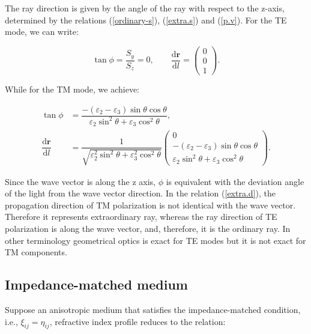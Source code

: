 \documentclass[9pt,twocolumn,twoside]{osajnl}
\begin{document}
 The ray direction is given by the angle of the ray with respect to the z-axis, determined  by the relations (\ref{ordinary-s}), (\ref{extra.s}) and (\ref{p.v}).
 For the TE mode, we can write:

 \begin{equation}\label{ordinary-d}
\tan{\phi}=\dfrac{S_{y}}{S_{z}}=0, \qquad \dfrac{\mathbf{\mathrm{d}{r}}}{\mathrm{d}{l}}=
 \begin{pmatrix}
 0\\0\\1
 \end{pmatrix}.
\end{equation}

While for the TM mode, we achieve:

\begin{equation}\label{extra.d}\begin{split}
\tan\phi & =\dfrac{-(\varepsilon_{2}-\varepsilon_{3})\sin{\theta}\cos{\theta}}{\varepsilon_{2} \sin^{2}{\theta} + \varepsilon_{3}\cos^{2}{\theta}},\\
 \dfrac{\mathbf{\mathrm{d}{r}}}{\mathrm{d}{l}} & =\dfrac{1}{\sqrt{\varepsilon_{2}^{2} \sin^{2}{\theta} + \varepsilon_{3}^{2}\cos^{2}{\theta}}}
 \begin{pmatrix}
 0\\ -(\varepsilon_{2}-\varepsilon_{3})\sin{\theta}\cos{\theta}  \\  \varepsilon_{2} \sin^{2}{\theta} + \varepsilon_{3}\cos^{2}{\theta}
 \end{pmatrix}.
\end{split}\end{equation}

Since the wave vector is along the z axis, $\phi$ is equivalent with the deviation angle of the light from the wave vector direction.
In the relation (\ref{extra.d}), the propagation direction of TM polarization is not identical with the wave vector. Therefore it represents extraordinary ray, whereas the ray direction of TE polarization is along the wave vector, and, therefore, it is the ordinary ray. In other terminology geometrical optics is exact for TE modes but it is not exact for TM components. 

\subsection{Impedance-matched  medium}\label{impedance-matched}

 Suppose an anisotropic medium that satisfies the impedance-matched condition, i.e., $ \xi_{ij} =\eta_{ij} $, refractive index profile reduces to the relation:
\end{document}
